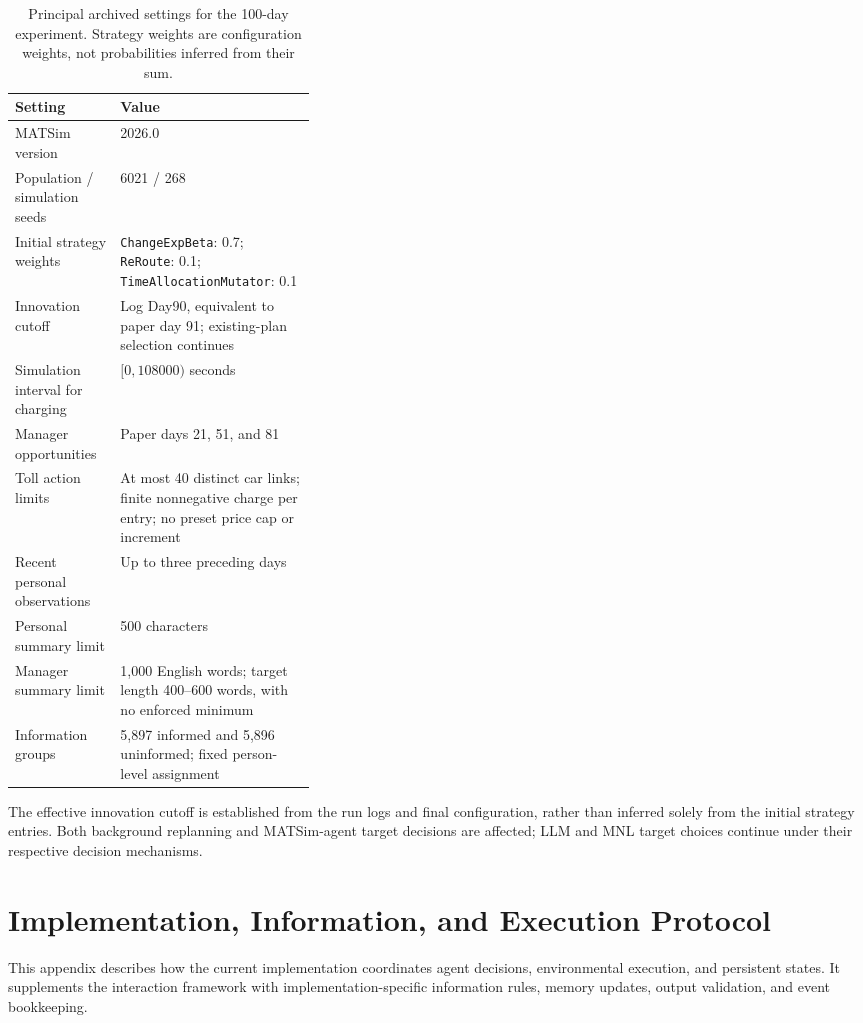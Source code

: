 \begin{table}[htbp]
\centering\small
\caption{Principal archived settings for the 100-day experiment. Strategy weights are configuration weights, not probabilities inferred from their sum.}
\label{tab:configuration}
\renewcommand{\arraystretch}{1.15}
\begin{tabularx}{\linewidth}{@{}>{\raggedright\arraybackslash}p{0.35\linewidth}X@{}}
\toprule
Setting & Value \\
\midrule
MATSim version & 2026.0 \\
Population / simulation seeds & 6021 / 268 \\
Initial strategy weights & \texttt{ChangeExpBeta}: 0.7; \texttt{ReRoute}: 0.1; \texttt{TimeAllocationMutator}: 0.1 \\
Innovation cutoff & Log Day90, equivalent to paper day 91; existing-plan selection continues \\
Simulation interval for charging & $[0,108000)$ seconds \\
Manager opportunities & Paper days 21, 51, and 81 \\
Toll action limits & At most 40 distinct car links; finite nonnegative charge per entry; no preset price cap or increment \\
Recent personal observations & Up to three preceding days \\
Personal summary limit & 500 characters \\
Manager summary limit & 1,000 English words; target length 400--600 words, with no enforced minimum \\
Information groups & 5,897 informed and 5,896 uninformed; fixed person-level assignment \\
\bottomrule
\end{tabularx}
\end{table}

The effective innovation cutoff is established from the run logs and final configuration, rather than inferred solely from the initial strategy entries. Both background replanning and MATSim-agent target decisions are affected; LLM and MNL target choices continue under their respective decision mechanisms.

\section{Implementation, Information, and Execution Protocol}
\label{app:implementation}

This appendix describes how the current implementation
coordinates agent decisions, environmental execution,
and persistent states. It supplements the interaction
framework with implementation-specific information rules,
memory updates, output validation, and event bookkeeping.

